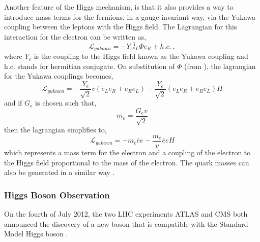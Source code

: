 Another feature of the Higgs mechanism, is that it also provides a way to
introduce mass terms for the fermions, in a gauge invariant way, via the Yukawa
coupling between the leptons with the Higgs field. The Lagrangian for this
interaction for the electron can be written as, 
\begin{equation}
\mathcal{L}_{yukawa} = -Y_{e}\bar{l}_L\Phi e_R + h.c. \ ,
\end{equation}
where $Y_{e}$ is the coupling to the Higgs field known as the Yukawa coupling
and h.c. stands for hermitian conjugate. On substitution of $\Phi$ (from
), the lagrangian for the Yukawa couplings becomes,
\begin{equation}
\mathcal{L}_{yukawa} = 
-\frac{Y_{e}}{\sqrt{2}} v
(\bar{e}_L e_R + \bar{e}_R e_L)
-\frac{Y_{e}}{\sqrt{2}}
(\bar{e}_L e_R + \bar{e}_R e_L)H
\end{equation}
and if $G_e$ is chosen such that,
\begin{equation}
m_{e} = \frac{G_{e}v}{\sqrt{2}}
\end{equation}
then the lagrangian simplifies to,
\begin{equation}
\mathcal{L}_{yukawa} = 
- m_e \bar{e}e
- \frac{m_e}{v} \bar{e}e H
\end{equation}
which represents a mass term for the electron and a coupling of the electron to
the Higgs field proportional to the mass of the electron.
The quark masses can also be generated in a similar way \cite{halzen}.

\subsubsection{Higgs Boson Observation}
On the fourth of July 2012, the two LHC experiments ATLAS and CMS both announced
the discovery of a new boson that is compatible with the Standard Model Higgs
boson \cite{aad2012observation,chatrchyan2012observation}. 

